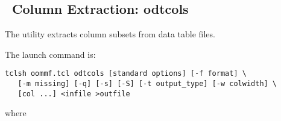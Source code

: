
\subsection{\ODT\ Column Extraction: odtcols}\label{sec:odtcols}%

The  utility extracts column
subsets from  data
table files.

The  launch command is:
\begin{verbatim}
tclsh oommf.tcl odtcols [standard options] [-f format] \
   [-m missing] [-q] [-s] [-S] [-t output_type] [-w colwidth] \
   [col ...] <infile >outfile
\end{verbatim}
where
